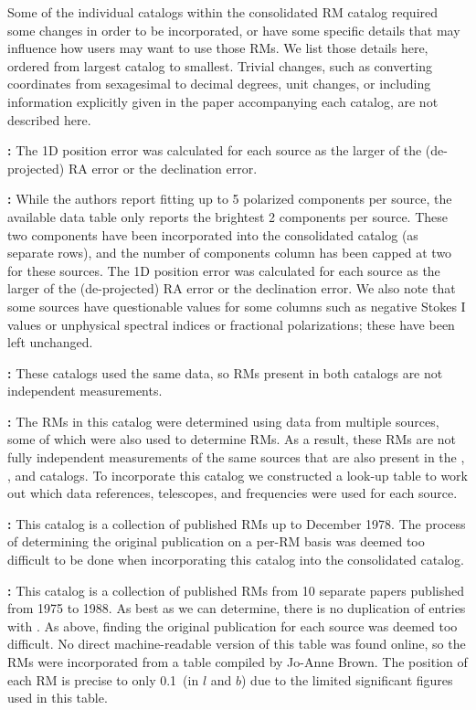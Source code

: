 \documentclass[10pt,modern]{aastex63}
\begin{document}
Some of the individual catalogs within the consolidated RM catalog required some changes in order to be incorporated, or have some specific details that may influence how users may want to use those RMs. We list those details here, ordered from largest catalog to smallest. Trivial changes, such as converting coordinates from sexagesimal to decimal degrees, unit changes, or including information explicitly given in the paper accompanying each catalog, are not described here.

{\bf \citet{Taylor09}:} The 1D position error was calculated for each source as the larger of the (de-projected) RA error or the declination error.

{\bf \citet{Schnitzeler2019}:} While the authors report fitting up to 5 polarized components per source, the available data table only reports the brightest 2 components per source. These two components have been incorporated into the consolidated catalog (as separate rows), and the number of components column has been capped at two for these sources. The 1D position error was calculated for each source as the larger of the (de-projected) RA error or the declination error. We also note that some sources have questionable values for some columns such as negative Stokes I values or unphysical spectral indices or fractional polarizations; these have been left unchanged.

{\bf \citet{Brown2003, VanEck2021}:} These catalogs used the same data, so RMs present in both catalogs are not independent measurements.

{\bf \citet{Farnes2014}:} The RMs in this catalog were determined using data from multiple sources, some of which were also used to determine RMs. As a result, these RMs are not fully independent measurements of the same sources that are also present in the \citet{Klein2003}, \citet{Rossetti2008}, and \citet{Taylor09} catalogs. To incorporate this catalog we constructed a look-up table to work out which data references, telescopes, and frequencies were used for each source.

{\bf \citet{Tabara1980}:} This catalog is a collection of published RMs up to December 1978. The process of determining the original publication on a per-RM basis was deemed too difficult to be done when incorporating this catalog into the consolidated catalog.

{\bf \citet{Broten1988}:} This catalog is a collection of published RMs from 10 separate papers published from 1975 to 1988. As best as we can determine, there is no duplication of entries with \citet{Tabara1980}. As above, finding the original publication for each source was deemed too difficult. No direct machine-readable version of this table was found online, so the RMs were incorporated from a table compiled by Jo-Anne Brown. The position of each RM is precise to only 0.1\degr\ (in $l$ and $b$) due to the limited significant figures used in this table.
\end{document}
